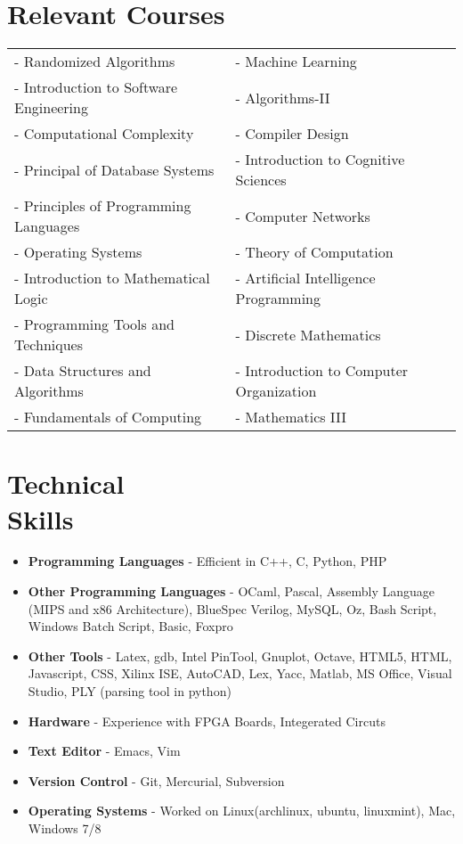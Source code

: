 \documentclass[margin,line]{resume}
\begin{document}
\begin{resume}
\begin{itemize}
  \end{itemize}




  \section{\mysidestyle Relevant Courses}

  \begin{tabular}{@{}p{6cm}p{6.5cm}}
    - Randomized Algorithms & - Machine Learning \\
    - Introduction to Software Engineering & - Algorithms-II \\
    - Computational Complexity &- Compiler Design \\
    - Principal of Database Systems &- Introduction to Cognitive Sciences \\
    - Principles of Programming Languages &- Computer Networks \\
    - Operating Systems &- Theory of Computation \\
    - Introduction to Mathematical Logic &- Artificial Intelligence Programming \\
    - Programming Tools and Techniques &- Discrete Mathematics \\
    - Data Structures and Algorithms & - Introduction to Computer Organization \\
    - Fundamentals of Computing &- Mathematics III
  \end{tabular}


  \section{\mysidestyle Technical \\Skills}

  \begin{itemize}
  \item \textbf{\textsf{Programming Languages}} - Efficient in C++, C, Python, PHP
  \item \textbf{\textsf{Other Programming Languages}} - OCaml, Pascal, Assembly Language (MIPS and x86 Architecture), BlueSpec Verilog, MySQL, Oz, Bash Script, Windows Batch Script, Basic, Foxpro
  \item \textbf{\textsf{Other Tools}} - Latex, gdb, Intel PinTool, Gnuplot, Octave, HTML5, HTML, Javascript, CSS, Xilinx ISE, AutoCAD, Lex, Yacc, Matlab, MS Office, Visual Studio, PLY (parsing tool in python)
  \item \textbf{\textsf{Hardware}} - Experience with FPGA Boards, Integerated Circuts
  \item \textbf{\textsf{Text Editor}} - Emacs, Vim
  \item \textbf{\textsf{Version Control}} - Git, Mercurial, Subversion
  \item \textbf{\textsf{Operating Systems}} - Worked on Linux(archlinux, ubuntu, linuxmint), Mac, Windows 7/8
  \end{itemize}


\end{resume}
\end{document}
